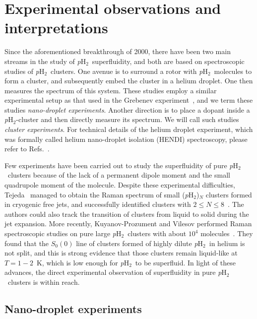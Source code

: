 \documentclass[12pt]{iopart}
\newcommand{\phtwo}{{\em p}H$_2$}
\begin{document}
\section{Experimental observations and interpretations} \label{sec:exp}

Since the aforementioned breakthrough of 2000, there have been two main streams in the study of \phtwo~superfluidity, 
and both are based on spectroscopic studies of \phtwo~clusters.
One avenue is to surround a rotor with \phtwo~molecules to form a cluster, and subsequently embed the cluster in a helium droplet.
One then measures the spectrum of this system. 
These studies employ a similar experimental setup as that used in the Grebenev \etal experiment~\cite{grebenev_OCS_pH2},
and we term these studies {\em nano-droplet experiments}. 
Another direction is to place a dopant inside a \phtwo-cluster and then directly measure its spectrum. 
We will call such studies {\em cluster experiments}. 
For technical details of the helium droplet experiment, which was formally called helium nano-droplet isolation (HENDI) spectroscopy, please refer to Refs.~\cite{callegari_hendi,electronic_he_droplet,glyoxal_sf_he,hendi_selection,hendi_selection_2,hendi_selection_3,hendi_kupper,toennies_beams,makarov_hendi,hendi_vilesov,hendi_stienkemeier,paesani_hcccn.hcn,mckellar_he_cluster}.

Few experiments have been carried out to study the superfluidity of pure \phtwo~clusters because of the lack of a permanent dipole moment and the small quadrupole moment of the molecule. Despite these experimental difficulties, Tejeda \etal~managed to obtain the Raman spectrum of small (\phtwo)$_N$ clusters formed in cryogenic free jets, and successfully identified clusters with $2 \le N \le 8$~\cite{tejeda_raman_ph2_cluster}. 
The authors could also track the transition of clusters from liquid to solid during the jet expansion. 
More recently, Kuyanov-Prozument and Vilesov performed Raman spectroscopic studies on pure large \phtwo~clusters with about $10^4$ molecules~\cite{vilesov_raman_large_h2}. 
They found that the $S_0\left( 0\right)$ line of  clusters formed of highly dilute \phtwo~in helium is not split, 
and this is  strong evidence that those clusters remain liquid-like at $T=1-2$~K, which is low enough for \phtwo~to be superfluid. 
In light of these advances, the direct experimental observation of superfluidity in pure \phtwo~clusters is within reach.

\subsection{Nano-droplet experiments} \label{subsec:droplet_exp}
\end{document}
